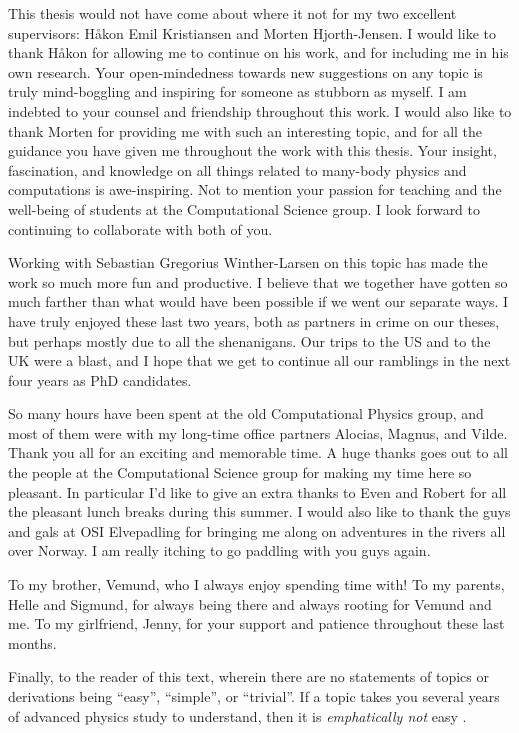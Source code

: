 This thesis would not have come about where it not for my two excellent
supervisors: Håkon Emil Kristiansen and Morten Hjorth-Jensen.
I would like to thank Håkon for allowing me to continue on his work, and for
including me in his own research.
Your open-mindedness towards new suggestions on any topic is truly mind-boggling
and inspiring for someone as stubborn as myself.
I am indebted to your counsel and friendship throughout this work.
I would also like to thank Morten for providing me with such an interesting
topic, and for all the guidance you have given me throughout the work with this
thesis.
Your insight, fascination, and knowledge on all things related to many-body
physics and computations is awe-inspiring.
Not to mention your passion for teaching and the well-being of students at the
Computational Science group.
I look forward to continuing to collaborate with both of you.

Working with Sebastian Gregorius Winther-Larsen on this topic has made the work
so much more fun and productive.
I believe that we together have gotten so much farther than what would have been
possible if we went our separate ways.
I have truly enjoyed these last two years, both as partners in crime on our
theses, but perhaps mostly due to all the shenanigans.
Our trips to the US and to the UK were a blast, and I hope that we get to
continue all our ramblings in the next four years as PhD candidates.

So many hours have been spent at the old Computational Physics group, and most
of them were with my long-time office partners Alocias, Magnus, and Vilde.
Thank you all for an exciting and memorable time.
A huge thanks goes out to all the people at the Computational Science group for
making my time here so pleasant.
In particular I'd like to give an extra thanks to Even and Robert for all the
pleasant lunch breaks during this summer.
I would also like to thank the guys and gals at OSI Elvepadling for bringing me
along on adventures in the rivers all over Norway.
I am really itching to go paddling with you guys again.

To my brother, Vemund, who I always enjoy spending time with!
To my parents, Helle and Sigmund, for always being there and always rooting for
Vemund and me.
To my girlfriend, Jenny, for your support and patience throughout these last
months.


Finally, to the reader of this text, wherein there are no statements of topics
or derivations being ``easy'', ``simple'', or ``trivial''.
If a topic takes you several years of advanced physics study to understand, then
it is \emph{emphatically not} easy \cite{nontrivial-manifesto}.
